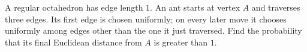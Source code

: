 A regular octahedron has edge length $1$. An ant starts at vertex $A$ and traverses three edges. Its first edge is chosen uniformly; on every later move it chooses uniformly among edges other than the one it just traversed. Find the probability that its final Euclidean distance from $A$ is greater than $1$.

